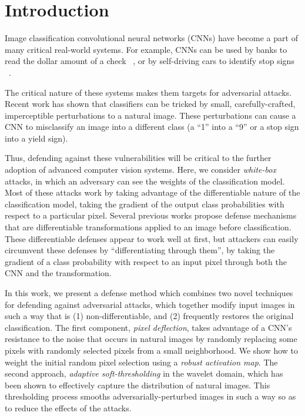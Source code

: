 \section{Introduction}


Image classification convolutional neural networks (CNNs) have become a part of many critical real-world systems.
For example, CNNs can be used by banks to read the dollar amount of a check ~\cite{Bottou1997GlobalTO}, or by self-driving cars to identify stop signs ~\cite{Papernot2016PracticalBA}.%

The critical nature of these systems makes them targets for adversarial attacks.
Recent work has shown that classifiers can be tricked by small, carefully-crafted, imperceptible perturbations to a natural image.
These perturbations can cause a CNN to misclassify an image into a different class (\eg a ``1'' into a ``9'' or a stop sign into a yield sign). 

Thus, defending against these vulnerabilities will be critical to the further adoption of advanced computer vision systems.
Here, we consider \emph{white-box} attacks, in which an adversary can see the weights of the classification model.
Most of these attacks work by taking advantage of the differentiable nature of the classification model, \ie taking the gradient of the output class probabilities with respect to a particular pixel. 
Several previous works propose defense mechanisms that are differentiable transformations applied to an image before classification.
These differentiable defenses appear to work well at first, but attackers can easily circumvent these defenses by ``differentiating through them'', \ie by taking the gradient of a class probability with respect to an input pixel through both the CNN and the transformation. 

In this work, we present a defense method which combines two novel techniques for defending against adversarial attacks, which together modify input images in such a way that is (1) non-differentiable, and (2) frequently restores the original classification.
The first component, \emph{pixel deflection}, takes advantage of a CNN's resistance to the noise that occurs in natural images by randomly replacing some pixels with randomly selected pixels from a small neighborhood.
We show how to weight the initial random pixel selection using a \emph{robust activation map}.
The second approach, \emph{adaptive soft-thresholding} in the wavelet domain, which has been shown to effectively capture the distribution of natural images.
This thresholding process smooths adversarially-perturbed images in such a way so as to reduce the effects of the attacks.

